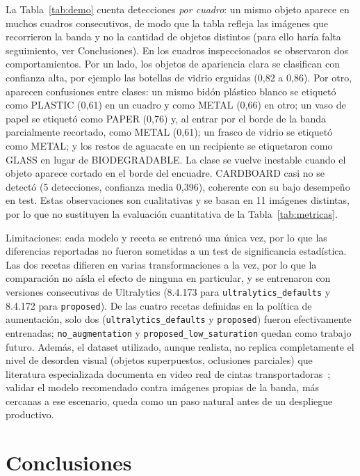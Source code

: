 \documentclass[conference]{IEEEtran}
\begin{document}
La Tabla~\ref{tab:demo} cuenta detecciones \emph{por cuadro}: un mismo objeto aparece en muchos
cuadros consecutivos, de modo que la tabla refleja las im\'agenes que recorrieron la banda y no
la cantidad de objetos distintos (para ello har\'ia falta seguimiento, ver Conclusiones). En los
cuadros inspeccionados se observaron dos comportamientos. Por un lado, los objetos de apariencia
clara se clasifican con confianza alta, por ejemplo las botellas de vidrio erguidas (0,82 a
0,86). Por otro, aparecen confusiones entre clases: un mismo bid\'on pl\'astico blanco se
etiquet\'o como PLASTIC (0,61) en un cuadro y como METAL (0,66) en otro; un vaso de papel se
etiquet\'o como PAPER (0,76) y, al entrar por el borde de la banda parcialmente recortado, como
METAL (0,61); un frasco de vidrio se etiquet\'o como METAL; y los restos de aguacate en un
recipiente se etiquetaron como GLASS en lugar de BIODEGRADABLE. La clase se vuelve inestable
cuando el objeto aparece cortado en el borde del encuadre. CARDBOARD casi no se detect\'o (5
detecciones, confianza media 0,396), coherente con su bajo desempe\~no en test. Estas
observaciones son cualitativas y se basan en 11 im\'agenes distintas, por lo que no sustituyen la
evaluaci\'on cuantitativa de la Tabla~\ref{tab:metricas}.

Limitaciones: cada modelo y receta se entren\'o una \'unica vez, por lo que las diferencias
reportadas no fueron sometidas a un test de significancia estad\'istica. Las dos recetas
difieren en varias transformaciones a la vez, por lo que la comparaci\'on no a\'isla el efecto
de ninguna en particular, y se entrenaron con versiones consecutivas de Ultralytics (8.4.173
para \texttt{ultralytics\_defaults} y 8.4.172 para \texttt{proposed}). De las cuatro recetas definidas en la pol\'itica de aumentaci\'on, solo dos
(\texttt{ultralytics\_defaults} y \texttt{proposed}) fueron efectivamente entrenadas;
\texttt{no\_augmentation} y \texttt{proposed\_low\_saturation} quedan como trabajo futuro.
Adem\'as, el dataset
utilizado, aunque realista, no replica completamente el nivel de desorden visual (objetos
superpuestos, oclusiones parciales) que literatura especializada documenta en video real de
cintas transportadoras~\cite{bashkirova2022}; validar el modelo recomendado contra im\'agenes
propias de la banda, m\'as cercanas a ese escenario, queda como un paso natural antes de un
despliegue productivo.

\section{Conclusiones}
\end{document}
